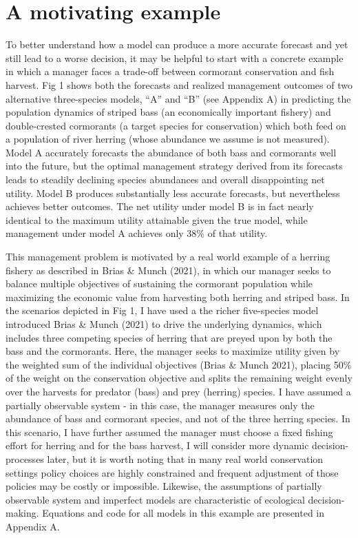 \documentclass[3p]{elsarticle} %
\begin{document}
\hypertarget{a-motivating-example}{%
\section{A motivating example}\label{a-motivating-example}}

To better understand how a model can produce a more accurate forecast
and yet still lead to a worse decision, it may be helpful to start with
a concrete example in which a manager faces a trade-off between
cormorant conservation and fish harvest. Fig 1 shows both the forecasts
and realized management outcomes of two alternative three-species
models, ``A'' and ``B'' (see Appendix A) in predicting the population
dynamics of striped bass (an economically important fishery) and
double-crested cormorants (a target species for conservation) which both
feed on a population of river herring (whose abundance we assume is not
measured). Model A accurately forecasts the abundance of both bass and
cormorants well into the future, but the optimal management strategy
derived from its forecasts leads to steadily declining species
abundances and overall disappointing net utility. Model B produces
substantially less accurate forecasts, but nevertheless achieves better
outcomes. The net utility under model B is in fact nearly identical to
the maximum utility attainable given the true model, while management
under model A achieves only 38\% of that utility.

This management problem is motivated by a real world example of a
herring fishery as described in Brias \& Munch (2021), in which our
manager seeks to balance multiple objectives of sustaining the cormorant
population while maximizing the economic value from harvesting both
herring and striped bass. In the scenarios depicted in Fig 1, I have
used a the richer five-species model introduced Brias \& Munch (2021) to
drive the underlying dynamics, which includes three competing species of
herring that are preyed upon by both the bass and the cormorants. Here,
the manager seeks to maximize utility given by the weighted sum of the
individual objectives (Brias \& Munch 2021), placing 50\% of the weight
on the conservation objective and splits the remaining weight evenly
over the harvests for predator (bass) and prey (herring) species. I have
assumed a partially observable system - in this case, the manager
measures only the abundance of bass and cormorant species, and not of
the three herring species. In this scenario, I have further assumed the
manager must choose a fixed fishing effort for herring and for the bass
harvest, I will consider more dynamic decision-processes later, but it
is worth noting that in many real world conservation settings policy
choices are highly constrained and frequent adjustment of those policies
may be costly or impossible. Likewise, the assumptions of partially
observable system and imperfect models are characteristic of ecological
decision-making. Equations and code for all models in this example are
presented in Appendix A.
\end{document}

